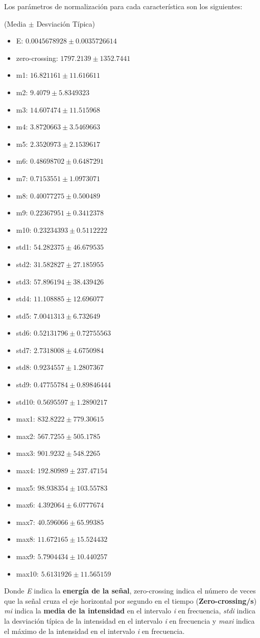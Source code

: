 \documentclass[12pt]{article}
\begin{document}
\bigskip
Los parámetros de normalización para cada característica son los siguientes:

(Media $\pm$ Desviación Típica)
\begin{itemize}
	\item E: $0.0045678928 \pm 0.0035726614$
	\item zero-crossing: $1797.2139 \pm 1352.7441$
	\item m1: $16.821161 \pm 11.616611$
	\item m2: $9.4079 \pm 5.8349323$
	\item m3: $14.607474 \pm 11.515968$
	\item m4: $3.8720663 \pm 3.5469663$
	\item m5: $2.3520973 \pm 2.1539617$
	\item m6: $0.48698702 \pm 0.6487291$
	\item m7: $0.7153551 \pm 1.0973071$
	\item m8: $0.40077275 \pm 0.500489$
	\item m9: $0.22367951 \pm 0.3412378$
	\item m10: $0.23234393 \pm 0.5112222$
	\item std1: $54.282375 \pm 46.679535$
	\item std2: $31.582827 \pm 27.185955$
	\item std3: $57.896194 \pm 38.439426$
	\item std4: $11.108885 \pm 12.696077$
	\item std5: $7.0041313 \pm 6.732649$
	\item std6: $0.52131796 \pm 0.72755563$
	\item std7: $2.7318008 \pm 4.6750984$
	\item std8: $0.9234557 \pm 1.2807367$
	\item std9: $0.47755784 \pm 0.89846444$
	\item std10: $0.5695597 \pm 1.2890217$
	\item max1: $832.8222 \pm 779.30615$
	\item max2: $567.7255 \pm 505.1785$
	\item max3: $901.9232 \pm 548.2265$
	\item max4: $192.80989 \pm 237.47154$
	\item max5: $98.938354 \pm 103.55783$
	\item max6: $4.392064 \pm 6.0777674$
	\item max7: $40.596066 \pm 65.99385$
	\item max8: $11.672165 \pm 15.524432$
	\item max9: $5.7904434 \pm 10.440257$
	\item max10: $5.6131926 \pm 11.565159$
\end{itemize}
Donde \textit{E} indica la \textbf{energía de la señal}, zero-crossing indica el número de veces que la señal cruza
el eje horizontal por segundo en el tiempo (\textbf{Zero-crossing/s})
\textit{mi} indica la \textbf{media de la intensidad} en el intervalo \textit{i} en frecuencia, 
\textit{stdi} indica la {desviación típica de la intensidad} en el intervalo \textit{i} en frecuencia
y \textit{maxi} indica el máximo de la intensidad en el intervalo \textit{i} en frecuencia.  
\end{document}
